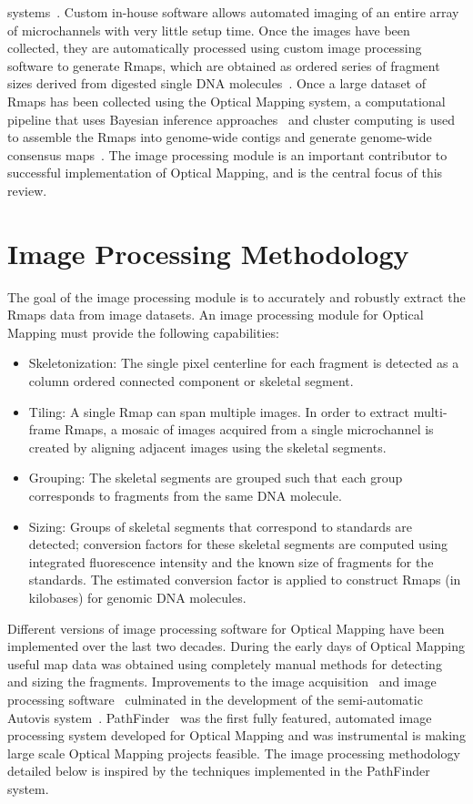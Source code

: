 \documentclass{bmcart}
\begin{document}
systems~\cite{Dimalanta2004, Jing1998, Skiadas1999, Zhou2004}. Custom in-house software allows automated imaging of an entire array of microchannels with very 
little setup time. Once the images have been collected, they are automatically processed using custom image processing software to generate Rmaps, which are 
obtained as ordered series of fragment sizes derived from digested single DNA 
molecules~\cite{Dimalanta2004, Teague2010}. Once a large dataset of Rmaps has 
been collected using the Optical Mapping system, a computational pipeline that 
uses Bayesian inference approaches~\cite{Anantharaman1999} and cluster 
computing is used to assemble the Rmaps into genome-wide contigs and generate 
genome-wide consensus 
maps~\cite{Teague2010, Valouev2006a, Valouev2006b, Valouev2006c}. The image 
processing module is an important contributor to successful implementation of 
Optical Mapping, and is the central focus of this review.


\section*{Image Processing Methodology}
The goal of the image processing module is to accurately and robustly extract 
the Rmaps data from image datasets. An image processing module for 
Optical Mapping must provide the following capabilities:
\begin{itemize}
\item
Skeletonization: The single pixel centerline for each fragment is detected as a 
column ordered connected component or skeletal segment.
\item
Tiling: A single Rmap can span multiple images. In order to extract multi-frame 
Rmaps, a mosaic of images acquired from a single microchannel is created by 
aligning adjacent images using the skeletal segments.
\item
Grouping: The skeletal segments are grouped such that each group corresponds to 
fragments from the same DNA molecule.
\item
Sizing: Groups of skeletal segments that correspond to standards are 
detected; conversion factors for these skeletal segments are computed 
using integrated fluorescence intensity and the known size of fragments for the standards. The estimated conversion factor is applied to construct Rmaps (in 
kilobases) for genomic DNA molecules.         
\end{itemize}
Different versions of image processing software for Optical Mapping have been implemented over the last two decades. During the early days of Optical Mapping 
useful map data was obtained using completely manual methods for detecting and 
sizing the fragments. Improvements to the image acquisition~\cite{Jing1998} and 
image processing software~\cite{Skiadas1999} culminated in the development of 
the semi-automatic Autovis system~\cite{Lim2001}. PathFinder~\cite{Dimalanta2004, Zhou2004} was the first fully featured, automated image processing system 
developed for Optical Mapping and was instrumental is making large scale Optical Mapping projects feasible. The image processing methodology detailed below is 
inspired by the techniques implemented in the PathFinder system.         
\end{document}
